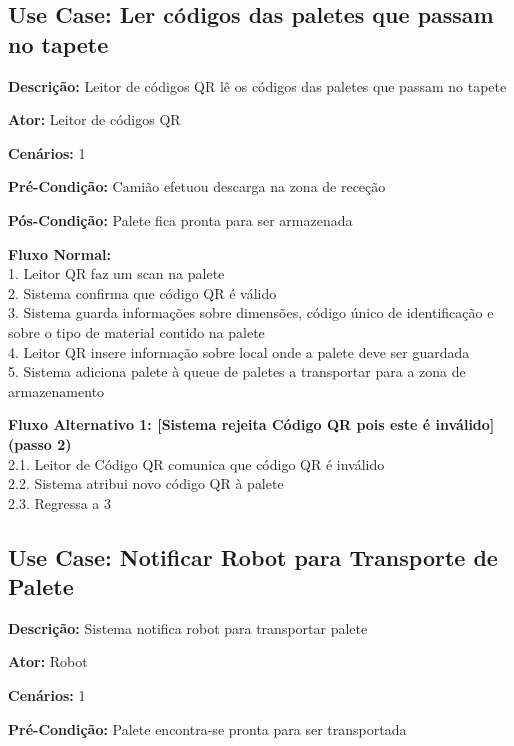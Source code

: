 \documentclass[11pt]{article}
\begin{document}
\vspace{3cm}


\subsection{Use Case: Ler códigos das paletes que passam no tapete}

\textbf{Descrição:} Leitor de códigos QR lê os códigos das paletes que passam no tapete

\textbf{Ator:} Leitor de códigos QR 

\textbf{Cenários:} 1

\textbf{Pré-Condição:} Camião efetuou descarga na zona de receção

\textbf{Pós-Condição:} Palete fica pronta para ser armazenada

\textbf{Fluxo Normal:}\\
        1. Leitor QR faz um scan na palete\\
	    2. Sistema confirma que código QR é válido\\
	    3. Sistema guarda informações sobre dimensões, código único de identificação e sobre o tipo de material contido na palete\\
	    4. Leitor QR insere informação sobre local onde a palete deve ser guardada\\
	    5. Sistema adiciona palete à queue de paletes a transportar para a zona de armazenamento
        
\textbf{Fluxo Alternativo 1: [Sistema rejeita Código QR pois este é inválido] (passo 2)}\\
        2.1. Leitor de Código QR comunica que código QR é inválido\\
	    2.2. Sistema atribui novo código QR à palete\\
        2.3. Regressa a 3
   
   
\vspace{3cm}
   
        
\subsection{Use Case: Notificar Robot para Transporte de Palete}

\textbf{Descrição:} Sistema notifica robot para transportar palete

\textbf{Ator:} Robot

\textbf{Cenários:} 1

\textbf{Pré-Condição:} Palete encontra-se pronta para ser transportada
\end{document}
